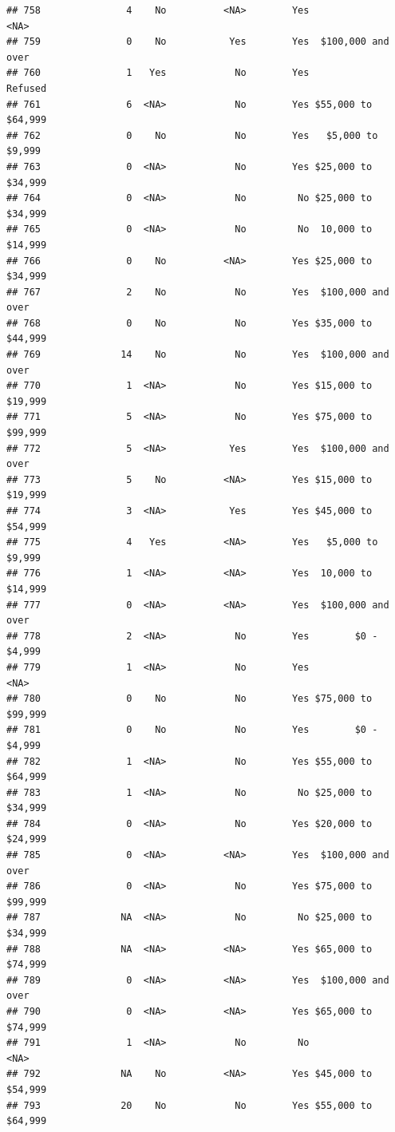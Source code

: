\documentclass[man]{apa6}
\begin{document}
\begin{verbatim}
## 758               4    No          <NA>        Yes               <NA>
## 759               0    No           Yes        Yes  $100,000 and over
## 760               1   Yes            No        Yes            Refused
## 761               6  <NA>            No        Yes $55,000 to $64,999
## 762               0    No            No        Yes   $5,000 to $9,999
## 763               0  <NA>            No        Yes $25,000 to $34,999
## 764               0  <NA>            No         No $25,000 to $34,999
## 765               0  <NA>            No         No  10,000 to $14,999
## 766               0    No          <NA>        Yes $25,000 to $34,999
## 767               2    No            No        Yes  $100,000 and over
## 768               0    No            No        Yes $35,000 to $44,999
## 769              14    No            No        Yes  $100,000 and over
## 770               1  <NA>            No        Yes $15,000 to $19,999
## 771               5  <NA>            No        Yes $75,000 to $99,999
## 772               5  <NA>           Yes        Yes  $100,000 and over
## 773               5    No          <NA>        Yes $15,000 to $19,999
## 774               3  <NA>           Yes        Yes $45,000 to $54,999
## 775               4   Yes          <NA>        Yes   $5,000 to $9,999
## 776               1  <NA>          <NA>        Yes  10,000 to $14,999
## 777               0  <NA>          <NA>        Yes  $100,000 and over
## 778               2  <NA>            No        Yes        $0 - $4,999
## 779               1  <NA>            No        Yes               <NA>
## 780               0    No            No        Yes $75,000 to $99,999
## 781               0    No            No        Yes        $0 - $4,999
## 782               1  <NA>            No        Yes $55,000 to $64,999
## 783               1  <NA>            No         No $25,000 to $34,999
## 784               0  <NA>            No        Yes $20,000 to $24,999
## 785               0  <NA>          <NA>        Yes  $100,000 and over
## 786               0  <NA>            No        Yes $75,000 to $99,999
## 787              NA  <NA>            No         No $25,000 to $34,999
## 788              NA  <NA>          <NA>        Yes $65,000 to $74,999
## 789               0  <NA>          <NA>        Yes  $100,000 and over
## 790               0  <NA>          <NA>        Yes $65,000 to $74,999
## 791               1  <NA>            No         No               <NA>
## 792              NA    No          <NA>        Yes $45,000 to $54,999
## 793              20    No            No        Yes $55,000 to $64,999

\end{verbatim}
\end{document}
